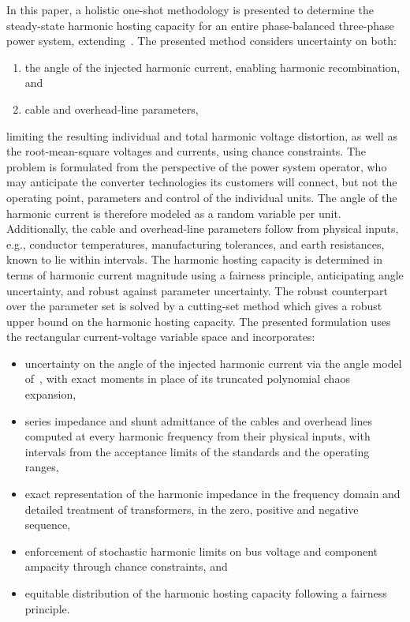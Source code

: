 In this paper, a holistic one-shot methodology is presented to determine the steady-state harmonic hosting capacity for an entire phase-balanced three-phase power system, extending~\cite{vanacker_shhc}. The presented method considers uncertainty on both: 
\begin{enumerate}
    \item [(i)] the angle of the injected harmonic current, enabling harmonic recombination, and
    \item [(ii)] cable and overhead-line parameters, 
\end{enumerate}
limiting the resulting individual and total harmonic voltage distortion, as well as the root-mean-square voltages and currents, using chance constraints. The problem is formulated from the perspective of the power system operator, who may anticipate the converter technologies its customers will connect, but not the operating point, parameters and control of the individual units. The angle of the harmonic current is therefore modeled as a random variable per unit. Additionally, the cable and overhead-line parameters follow from physical inputs, e.g., conductor temperatures, manufacturing tolerances, and earth resistances, known to lie within intervals. The harmonic hosting capacity is determined in terms of harmonic current magnitude using a fairness principle, anticipating angle uncertainty, and robust against parameter uncertainty. The robust counterpart over the parameter set is solved by a cutting-set method which gives a robust upper bound on the harmonic hosting capacity. The presented formulation uses the rectangular current-voltage variable space and incorporates:
\begin{itemize}
    \item uncertainty on the angle of the injected harmonic current via the angle model of~\cite{vanacker_shhc}, with exact moments in place of its truncated polynomial chaos expansion,
    \item series impedance and shunt admittance of the cables and overhead lines computed at every harmonic frequency from their physical inputs, with intervals from the acceptance limits of the standards and the operating ranges,
    \item exact representation of the harmonic impedance in the frequency domain and detailed treatment of transformers, in the zero, positive and negative sequence,
    \item enforcement of stochastic harmonic limits on bus voltage and component ampacity through chance constraints, and
    \item equitable distribution of the harmonic hosting capacity following a fairness principle.
\end{itemize}
